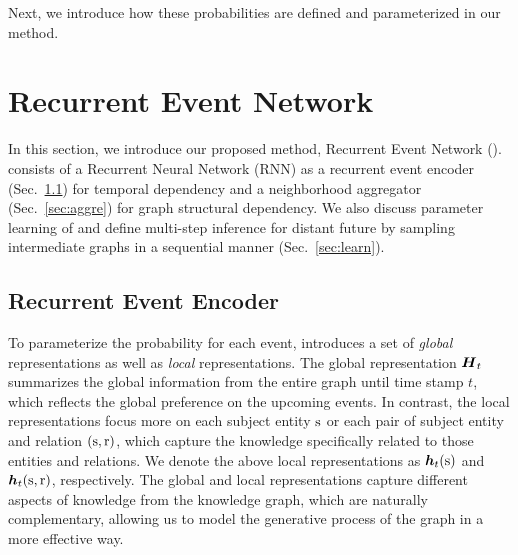 Next, we introduce how these probabilities are defined and parameterized in our method.


\section{Recurrent Event Network}
\label{sec:re-net}
In this section, we introduce our proposed method, Recurrent Event Network (\method).
\method consists of a Recurrent Neural Network (RNN) as a recurrent event encoder (Sec.~\ref{sec:encoder}) for temporal dependency and a neighborhood aggregator (Sec.~\ref{sec:aggre}) for graph structural dependency.
We also discuss parameter learning of \method and define multi-step inference for distant future by sampling intermediate graphs in a sequential manner (Sec.~\ref{sec:learn}). 


\subsection{Recurrent Event Encoder}
\label{sec:encoder}

To parameterize the probability for each event, \method introduces a set of \textit{global} representations as well as \textit{local} representations. The global representation $\boldsymbol{H}_{t}$ summarizes the global information from the entire graph until time stamp $t$, which reflects the global preference on the upcoming events. In contrast, the local representations focus more on each subject entity $\mathrm{s}$ or each pair of subject entity and relation $(\mathrm{s},\mathrm{r})$, which capture the knowledge specifically related to those entities and relations. 
We denote the above local representations as $\boldsymbol{h}_{t}(\mathrm{s})$ and $\boldsymbol{h}_{t}(\mathrm{s},\mathrm{r})$, respectively. 
The global and local representations capture different aspects of knowledge from the knowledge graph, which are naturally complementary, allowing us to model the generative process of the graph in a more effective way.

